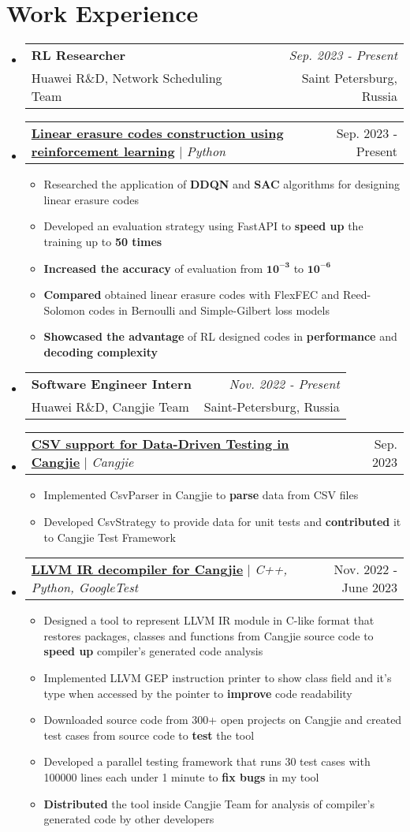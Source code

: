 \documentclass[english,russian,letterpaper,11pt]{article}
\makeatletter
\newcommand{\resumeItem}[1]{
  \item\small{
    {#1 \vspace{-2pt}}
  }
}
\newcommand{\resumeWorkExpHeading}[4]{
  \vspace{-2pt}\item
    \begin{tabular*}{0.97\textwidth}[t]{l@{\extracolsep{\fill}}r}
      \textbf{#1} & \textit{#2} \\
      #3 & #4 \\
    \end{tabular*}\vspace{-7pt}
}
\newcommand{\resumeProjectHeading}[2]{
    \item
    \begin{tabular*}{0.97\textwidth}{l@{\extracolsep{\fill}}r}
      \small#1 & #2 \\
    \end{tabular*}\vspace{-7pt}
}
\newcommand{\resumeSubHeadingListStart}{\begin{itemize}[leftmargin=0.15in, label={}]}
\newcommand{\resumeSubHeadingListEnd}{\end{itemize}}
\newcommand{\resumeItemListStart}{\begin{itemize}}
\newcommand{\resumeItemListEnd}{\end{itemize}\vspace{-5pt}}
\makeatother
\begin{document}
\section{Work Experience}
    \resumeSubHeadingListStart
    \resumeWorkExpHeading
      {RL Researcher}{Sep. 2023 - Present}
      {Huawei R\&D, Network Scheduling Team}{Saint Petersburg, Russia}
    \resumeProjectHeading
          {\underline{\textbf{Linear erasure codes construction using reinforcement learning}} $|$ \emph{Python}}{Sep. 2023 - Present}
          \resumeItemListStart
            \resumeItem{Researched the application of \textbf{DDQN} and \textbf{SAC} algorithms for designing linear erasure codes}
            \resumeItem{Developed an evaluation strategy using FastAPI to \textbf{speed up} the training up to \textbf{50 times}}
            \resumeItem{\textbf{Increased the accuracy} of evaluation from $\mathbf{10^{-3}}$ to $\mathbf{10^{-6}}$}
            \resumeItem{\textbf{Compared} obtained linear erasure codes with FlexFEC and Reed-Solomon codes in Bernoulli and Simple-Gilbert loss models}
            \resumeItem{\textbf{Showcased the advantage} of RL designed codes in \textbf{performance} and \textbf{decoding complexity}}
          \resumeItemListEnd
    \resumeWorkExpHeading
      {Software Engineer Intern}{Nov. 2022 - Present}
      {Huawei R\&D, Cangjie Team}{Saint-Petersburg, Russia}
    \resumeProjectHeading
          {\underline{\textbf{CSV support for Data-Driven Testing in Cangjie}} $|$ \emph{Cangjie}}{Sep. 2023}
          \resumeItemListStart
            \resumeItem{Implemented CsvParser in Cangjie to \textbf{parse} data from CSV files}
            \resumeItem{Developed CsvStrategy to provide data for unit tests and \textbf{contributed} it to Cangjie Test Framework}
          \resumeItemListEnd
    \resumeProjectHeading
          {\underline{\textbf{LLVM IR decompiler for Cangjie}} $|$ \emph{C++, Python, GoogleTest}}{Nov. 2022 - June 2023}
          \resumeItemListStart
            \resumeItem{Designed a tool to represent LLVM IR module in C-like format that restores packages, classes and functions from Cangjie source code to \textbf{speed up} compiler's generated code analysis}
            \resumeItem{Implemented LLVM GEP instruction printer to show class field and it's type when accessed by the pointer to \textbf{improve} code readability}
            \resumeItem{Downloaded source code from 300+ open projects on Cangjie and created test cases from source code to \textbf{test} the tool}
            \resumeItem{Developed a parallel testing framework that runs 30 test cases with 100000 lines each under 1 minute to \textbf{fix bugs} in my tool}
            \resumeItem{\textbf{Distributed} the tool inside Cangjie Team for analysis of compiler's generated code by other developers}
          \resumeItemListEnd
    \resumeSubHeadingListEnd
\end{document}
